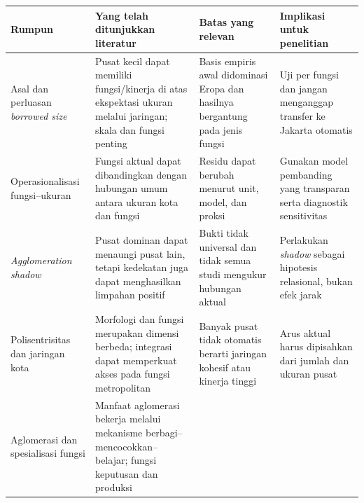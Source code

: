 \documentclass[
  indonesian,
  11pt,
  a4paper,
  oneside,
  openany]{report}
\newcounter{none} %
\begin{document}
{\def\LTcaptype{none} %
\begin{longtable}[]{@{}
  >{\raggedright\arraybackslash}p{}
  >{\raggedright\arraybackslash}p{}
  >{\raggedright\arraybackslash}p{}
  >{\raggedright\arraybackslash}p{}@{}}
\toprule\noalign{}
\begin{minipage}[b]{\linewidth}\raggedright
Rumpun
\end{minipage} & \begin{minipage}[b]{\linewidth}\raggedright
Yang telah ditunjukkan literatur
\end{minipage} & \begin{minipage}[b]{\linewidth}\raggedright
Batas yang relevan
\end{minipage} & \begin{minipage}[b]{\linewidth}\raggedright
Implikasi untuk penelitian
\end{minipage} \\
\midrule\noalign{}
\endhead
\bottomrule\noalign{}
\endlastfoot
Asal dan perluasan \emph{borrowed size} & Pusat kecil dapat memiliki
fungsi/kinerja di atas ekspektasi ukuran melalui jaringan; skala dan
fungsi penting & Basis empiris awal didominasi Eropa dan hasilnya
bergantung pada jenis fungsi & Uji per fungsi dan jangan menganggap
transfer ke Jakarta otomatis \\
Operasionalisasi fungsi--ukuran & Fungsi aktual dapat dibandingkan
dengan hubungan umum antara ukuran kota dan fungsi & Residu dapat
berubah menurut unit, model, dan proksi & Gunakan model pembanding yang
transparan serta diagnostik sensitivitas \\
\emph{Agglomeration shadow} & Pusat dominan dapat menaungi pusat lain,
tetapi kedekatan juga dapat menghasilkan limpahan positif & Bukti tidak
universal dan tidak semua studi mengukur hubungan aktual & Perlakukan
\emph{shadow} sebagai hipotesis relasional, bukan efek jarak \\
Polisentrisitas dan jaringan kota & Morfologi dan fungsi merupakan
dimensi berbeda; integrasi dapat memperkuat akses pada fungsi
metropolitan & Banyak pusat tidak otomatis berarti jaringan kohesif atau
kinerja tinggi & Arus aktual harus dipisahkan dari jumlah dan ukuran
pusat \\
Aglomerasi dan spesialisasi fungsi & Manfaat aglomerasi bekerja melalui
mekanisme berbagi--mencocokkan--belajar; fungsi keputusan dan produksi

\end{longtable}}
\end{document}
